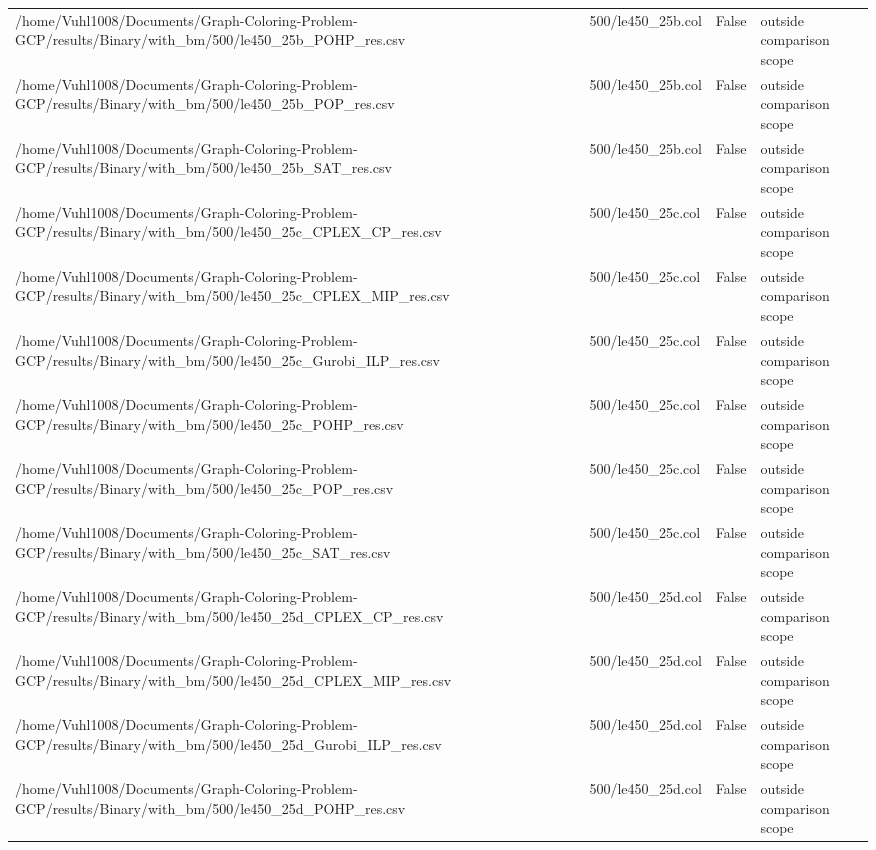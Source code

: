 \begin{table}[htbp]
\begin{tabular}{llll}
/home/Vuhl1008/Documents/Graph-Coloring-Problem-GCP/results/Binary/with\_bm/500/le450\_25b\_POHP\_res.csv & 500/le450\_25b.col & False & outside comparison scope \\
/home/Vuhl1008/Documents/Graph-Coloring-Problem-GCP/results/Binary/with\_bm/500/le450\_25b\_POP\_res.csv & 500/le450\_25b.col & False & outside comparison scope \\
/home/Vuhl1008/Documents/Graph-Coloring-Problem-GCP/results/Binary/with\_bm/500/le450\_25b\_SAT\_res.csv & 500/le450\_25b.col & False & outside comparison scope \\
/home/Vuhl1008/Documents/Graph-Coloring-Problem-GCP/results/Binary/with\_bm/500/le450\_25c\_CPLEX\_CP\_res.csv & 500/le450\_25c.col & False & outside comparison scope \\
/home/Vuhl1008/Documents/Graph-Coloring-Problem-GCP/results/Binary/with\_bm/500/le450\_25c\_CPLEX\_MIP\_res.csv & 500/le450\_25c.col & False & outside comparison scope \\
/home/Vuhl1008/Documents/Graph-Coloring-Problem-GCP/results/Binary/with\_bm/500/le450\_25c\_Gurobi\_ILP\_res.csv & 500/le450\_25c.col & False & outside comparison scope \\
/home/Vuhl1008/Documents/Graph-Coloring-Problem-GCP/results/Binary/with\_bm/500/le450\_25c\_POHP\_res.csv & 500/le450\_25c.col & False & outside comparison scope \\
/home/Vuhl1008/Documents/Graph-Coloring-Problem-GCP/results/Binary/with\_bm/500/le450\_25c\_POP\_res.csv & 500/le450\_25c.col & False & outside comparison scope \\
/home/Vuhl1008/Documents/Graph-Coloring-Problem-GCP/results/Binary/with\_bm/500/le450\_25c\_SAT\_res.csv & 500/le450\_25c.col & False & outside comparison scope \\
/home/Vuhl1008/Documents/Graph-Coloring-Problem-GCP/results/Binary/with\_bm/500/le450\_25d\_CPLEX\_CP\_res.csv & 500/le450\_25d.col & False & outside comparison scope \\
/home/Vuhl1008/Documents/Graph-Coloring-Problem-GCP/results/Binary/with\_bm/500/le450\_25d\_CPLEX\_MIP\_res.csv & 500/le450\_25d.col & False & outside comparison scope \\
/home/Vuhl1008/Documents/Graph-Coloring-Problem-GCP/results/Binary/with\_bm/500/le450\_25d\_Gurobi\_ILP\_res.csv & 500/le450\_25d.col & False & outside comparison scope \\
/home/Vuhl1008/Documents/Graph-Coloring-Problem-GCP/results/Binary/with\_bm/500/le450\_25d\_POHP\_res.csv & 500/le450\_25d.col & False & outside comparison scope \\

\end{tabular}
\end{table}
